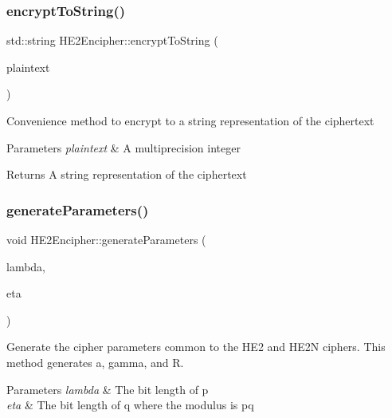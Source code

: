 \subsubsection{\texorpdfstring{encrypt\+To\+String()}{encryptToString()}\hspace{0.1cm}{\footnotesize\ttfamily [4/4]}}
{\footnotesize\ttfamily std\+::string H\+E2\+Encipher\+::encrypt\+To\+String (\begin{DoxyParamCaption}\item[{N\+T\+L\+::\+ZZ \&}]{plaintext }\end{DoxyParamCaption})\hspace{0.3cm}{\ttfamily [virtual]}}

Convenience method to encrypt to a string representation of the ciphertext 
\begin{DoxyParams}{Parameters}
{\em plaintext} & A multiprecision integer \\
\hline
\end{DoxyParams}
\begin{DoxyReturn}{Returns}
A string representation of the ciphertext 
\end{DoxyReturn}
\mbox{\label{classHE2Encipher_a13305651228f50d55e6ee905032e01af}} 
\subsubsection{\texorpdfstring{generate\+Parameters()}{generateParameters()}}
{\footnotesize\ttfamily void H\+E2\+Encipher\+::generate\+Parameters (\begin{DoxyParamCaption}\item[{int}]{lambda,  }\item[{int}]{eta }\end{DoxyParamCaption})\hspace{0.3cm}{\ttfamily [protected]}}

Generate the cipher parameters common to the H\+E2 and H\+E2N ciphers. This method generates {\ttfamily a}, {\ttfamily gamma}, and {\ttfamily R}. 
\begin{DoxyParams}{Parameters}
{\em lambda} & The bit length of {\ttfamily p} \\
\hline
{\em eta} & The bit length of {\ttfamily q} where the modulus is {\ttfamily pq} \\
\hline
\end{DoxyParams}
\mbox{\label{classHE2Encipher_a802a75d83bb833bf458a1e89792026bc}} 
